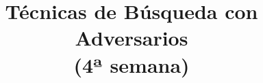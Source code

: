 \documentclass[a4paper,10pt]{article}
\title{Técnicas de Búsqueda con Adversarios\\(4ª semana)}
\author{}
\begin{document}
\maketitle
\pagebreak
\tableofcontents
\pagebreak
\end{document}
